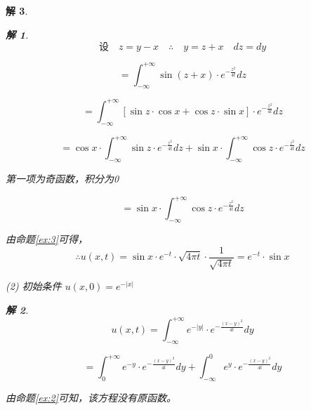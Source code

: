 \documentclass[12pt,a4paper]{article}
\newtheorem*{solution}{解}
\begin{document}
\begin{solution}
\begin{solution}
		\begin{equation*}
			\text{设} \quad z = y - x \quad \therefore \quad y = z + x \quad dz = dy
		\end{equation*}
		
		\begin{equation*}
			= \int_{-\infty}^{+\infty} \sin(z + x) \cdot e^{-\frac{z^2}{4t}} dz
		\end{equation*}
		
		\begin{equation*}
			= \int_{-\infty}^{+\infty} [\sin z \cdot \cos x + \cos z \cdot \sin x] \cdot e^{-\frac{z^2}{4t}} dz
		\end{equation*}
		
		\begin{equation*}
			= \cos x \cdot \int_{-\infty}^{+\infty} \sin z \cdot e^{-\frac{z^2}{4t}} dz + \sin x \cdot \int_{-\infty}^{+\infty} \cos z \cdot e^{-\frac{z^2}{4t}} dz
		\end{equation*}
		
	第一项为奇函数，积分为0
		
		\begin{equation*}
			=  \sin x \cdot \int_{-\infty}^{+\infty} \cos z \cdot e^{-\frac{z^2}{4t}} dz
		\end{equation*}
		
		由命题\eqref{ex:3}可得，
\begin{equation*}
	\therefore u(x,t) = \sin x \cdot e^{-t} \cdot \sqrt{4\pi t} \cdot \frac{1}{\sqrt{4\pi t}} = e^{-t} \cdot \sin x
\end{equation*}

	\end{solution}


	
(2) 初始条件 \( u(x,0) = e^{-|x|} \)
		\begin{solution}
	
	\begin{equation*}
	u(x,t)=	\int_{-\infty}^{+\infty} e^{-|y|} \cdot e^{-\frac{(x-y)^2}{4t}} dy
	\end{equation*}
	
	\begin{equation*}
		= \int_{0}^{+\infty} e^{-y} \cdot e^{-\frac{(x-y)^2}{4t}} dy + \int_{-\infty}^{0} e^{y} \cdot e^{-\frac{(x-y)^2}{4t}} dy
	\end{equation*}
	
	由命题\eqref{ex:2}可知，该方程没有原函数。
	
		\end{solution}
	

\end{solution}
\end{document}
